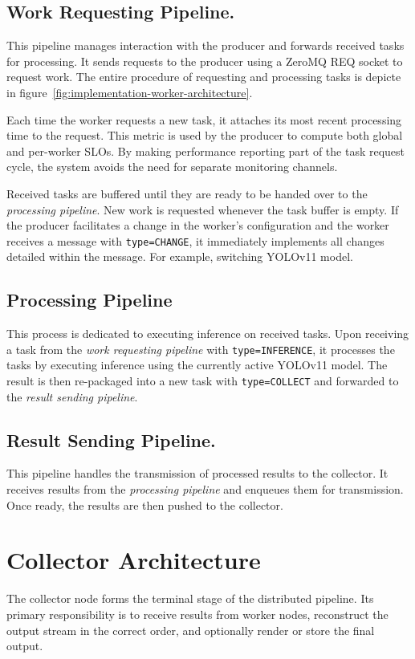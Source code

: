 \subsection{Work Requesting Pipeline.}
This pipeline manages interaction with the producer and forwards received tasks for processing. It sends requests to the producer using a ZeroMQ REQ socket to request work. The entire procedure of requesting and processing tasks is depicte in figure~\ref{fig:implementation-worker-architecture}.

Each time the worker requests a new task, it attaches its most recent processing time to the request. This metric is used by the producer to compute both global and per-worker SLOs. By making performance reporting part of the task request cycle, the system avoids the need for separate monitoring channels.

Received tasks are buffered until they are ready to be handed over to the \textit{processing pipeline}. New work is requested whenever the task buffer is empty. If the producer facilitates a change in the worker's configuration and the worker receives a message with \texttt{type=CHANGE}, it immediately implements all changes detailed within the message. For example, switching YOLOv11 model.

\subsection{Processing Pipeline}
This process is dedicated to executing inference on received tasks. Upon receiving a task from the \textit{work requesting pipeline} with \texttt{type=INFERENCE}, it processes the tasks by executing inference using the currently active YOLOv11 model. The result is then re-packaged into a new task with \texttt{type=COLLECT} and forwarded to the \textit{result sending pipeline}.

\subsection{Result Sending Pipeline.}
This pipeline handles the transmission of processed results to the collector. It receives results from the \textit{processing pipeline} and enqueues them for transmission. Once ready, the results are then pushed to the collector.

\section{Collector Architecture}
The collector node forms the terminal stage of the distributed pipeline. Its primary responsibility is to receive results from worker nodes, reconstruct the output stream in the correct order, and optionally render or store the final output. 

